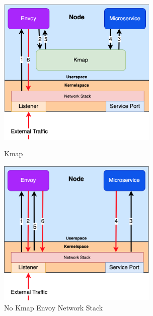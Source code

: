\begin{figure}[!htb]
    \begin{minipage}{0.5\textwidth}
        \centering
        \includegraphics[keepaspectratio=true,width=3in]{figures/design/kmap.png}
        \caption{Kmap}
        \label{fig:kmap}
    \end{minipage}%
    \begin{minipage}{0.5\textwidth}
        \centering
        \includegraphics[keepaspectratio=true,width=3in]{figures/design/no_kmap.png}
        \caption{No Kmap Envoy Network Stack}
        \label{fig:no_kmap}
    \end{minipage}%
\end{figure}


